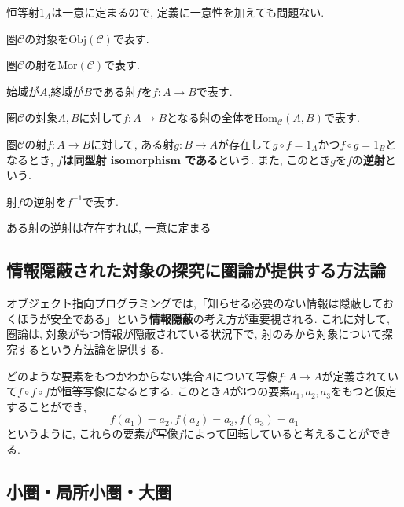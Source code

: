 \begin{caution}
恒等射$1_{A}$は一意に定まるので, 定義に一意性を加えても問題ない.
\end{caution}
\begin{Notation}
圏$\mathscr{C}$の対象を$\mathrm{Obj}(\mathscr{C})$で表す.
\end{Notation}
\begin{Notation}
圏$\mathscr{C}$の射を$\mathrm{Mor}(\mathscr{C})$で表す.
\end{Notation}

\begin{Notation}
始域が$A$,終域が$B$である射$f$を$f:A\rightarrow B$で表す.
\end{Notation}
\begin{Notation}
圏$\mathscr{C}$の対象$A,B$に対して$f:A\rightarrow B$となる射の全体を$\mathrm{Hom}_{\mathscr{C}}(A,B)$で表す.
\end{Notation}
\begin{Def}
圏$\mathscr{C}$の射$f:A\rightarrow B$に対して,
ある射$g:B\rightarrow A$が存在して$g\circ f=1_A$かつ$f\circ g=1_B$となるとき,
{\bf $f$は同型射 isomorphism である}という. また, このとき$g$を$f$の{\bf 逆射}という.
\end{Def}
\begin{Notation}
射$f$の逆射を$f^{-1}$で表す.
\end{Notation}
\begin{Prop}
ある射の逆射は存在すれば, 一意に定まる
\end{Prop}
\subsection{情報隠蔽された対象の探究に圏論が提供する方法論}
オブジェクト指向プログラミングでは,「知らせる必要のない情報は隠蔽しておくほうが安全である」という{\bf 情報隠蔽}の考え方が重要視される.
これに対して, 圏論は, 対象がもつ情報が隠蔽されている状況下で, 射のみから対象について探究するという方法論を提供する.
\begin{example}
どのような要素をもつかわからない集合$A$について写像$f:A\rightarrow A$が定義されていて$f\circ f\circ f$が恒等写像になるとする.
このとき$A$が3つの要素$a_1,a_2,a_3$をもつと仮定することができ,
\[
f(a_1)=a_2, f(a_2)=a_3, 
f(a_3)=a_1
\]
というように, これらの要素が写像$f$によって回転していると考えることができる.
\end{example}
\subsection{小圏・局所小圏・大圏}
